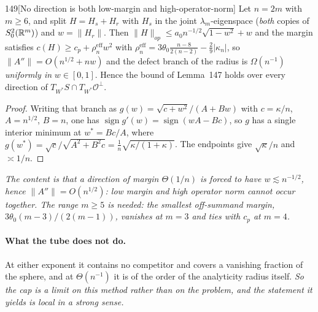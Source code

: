 \begin{Lem}{149}[No direction is both low-margin and high-operator-norm]
Let $n=2m$ with $m\ge6$, and split $H=H_s+H_r$ with $H_s$ in the joint $\lambda_m$-eigenspace (\emph{both} copies of $S^2_0(\mathbb{R}^m)$) and $w=\|H_r\|$. Then $\|H\|_{op}\le a_0n^{-1/2}\sqrt{1-w^2}+w$ and the margin satisfies $c(H)\ge c_p+\rho^{\mathrm{eff}}_nw^2$ with $\rho^{\mathrm{eff}}_n=3\theta_0\tfrac{n-8}{2(n-2)}-\tfrac29|\kappa_n|$, so $\|A''\|=O(n^{1/2}+nw)$ and the defect branch of the radius is $\Omega(n^{-1})$ \emph{uniformly in} $w\in[0,1]$. Hence the bound of Lemma~147 holds over every direction of $T_{W^*}S\cap T_{W^*}\mathcal O^\perp$.
\end{Lem}

\begin{proof}
Writing that branch as $g(w)=\sqrt{c+w^2}/(A+Bw)$ with $c=\kappa/n$, $A=n^{1/2}$, $B=n$, one has $\operatorname{sign}g'(w)=\operatorname{sign}(wA-Bc)$, so $g$ has a single interior minimum at $w^*=Bc/A$, where $g(w^*)=\sqrt c/\sqrt{A^2+B^2c}=\tfrac1n\sqrt{\kappa/(1+\kappa)}$. The endpoints give $\sqrt\kappa/n$ and $\asymp1/n$.
\end{proof}

\emph{The content is that a direction of margin $\Theta(1/n)$ is forced to have $w\lesssim n^{-1/2}$, hence $\|A''\|=O(n^{1/2})$: low margin and high operator norm cannot occur together. The range $m\ge5$ is needed: the smallest off-summand margin, $3\theta_0(m-3)/(2(m-1))$, vanishes at $m=3$ and ties with $c_p$ at $m=4$.}

\paragraph{What the tube does not do.} At either exponent it contains no competitor and covers a vanishing fraction of the sphere, and at $\Theta(n^{-1})$ it is of the order of the analyticity radius itself. \emph{So the cap is a limit on this method rather than on the problem, and the statement it yields is local in a strong sense.}


